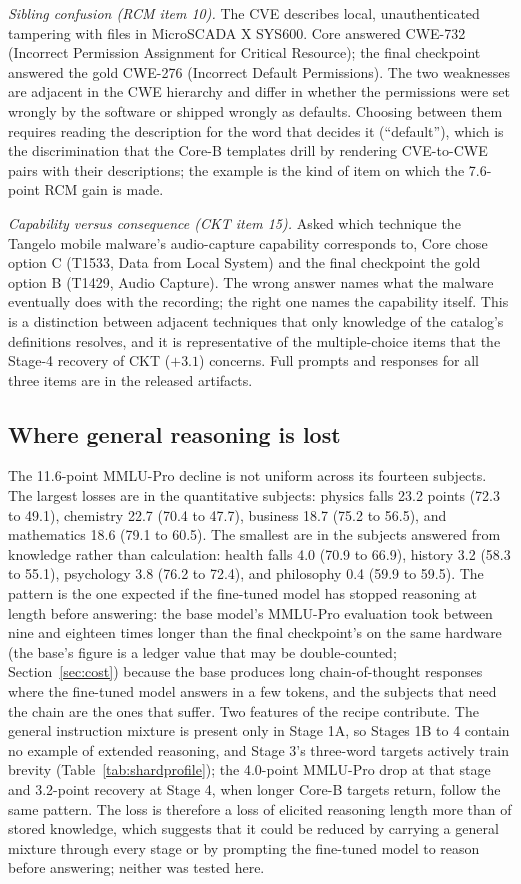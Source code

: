 \documentclass[a4paper,fleqn]{cas-dc}
\begin{document}
\emph{Sibling confusion (RCM item 10).} The CVE describes local, unauthenticated tampering with files in MicroSCADA X SYS600. Core answered CWE-732 (Incorrect Permission Assignment for Critical Resource); the final checkpoint answered the gold CWE-276 (Incorrect Default Permissions). The two weaknesses are adjacent in the CWE hierarchy and differ in whether the permissions were set wrongly by the software or shipped wrongly as defaults. Choosing between them requires reading the description for the word that decides it (``default''), which is the discrimination that the Core-B templates drill by rendering CVE-to-CWE pairs with their descriptions; the example is the kind of item on which the 7.6-point RCM gain is made.

\emph{Capability versus consequence (CKT item 15).} Asked which technique the Tangelo mobile malware's audio-capture capability corresponds to, Core chose option C (T1533, Data from Local System) and the final checkpoint the gold option B (T1429, Audio Capture). The wrong answer names what the malware eventually does with the recording; the right one names the capability itself. This is a distinction between adjacent techniques that only knowledge of the catalog's definitions resolves, and it is representative of the multiple-choice items that the Stage-4 recovery of CKT ($+3.1$) concerns. Full prompts and responses for all three items are in the released artifacts.

\subsection{Where general reasoning is lost}\label{sec:mmlu}
The 11.6-point MMLU-Pro decline is not uniform across its fourteen subjects. The largest losses are in the quantitative subjects: physics falls 23.2 points (72.3 to 49.1), chemistry 22.7 (70.4 to 47.7), business 18.7 (75.2 to 56.5), and mathematics 18.6 (79.1 to 60.5). The smallest are in the subjects answered from knowledge rather than calculation: health falls 4.0 (70.9 to 66.9), history 3.2 (58.3 to 55.1), psychology 3.8 (76.2 to 72.4), and philosophy 0.4 (59.9 to 59.5). The pattern is the one expected if the fine-tuned model has stopped reasoning at length before answering: the base model's MMLU-Pro evaluation took between nine and eighteen times longer than the final checkpoint's on the same hardware (the base's figure is a ledger value that may be double-counted; Section~\ref{sec:cost}) because the base produces long chain-of-thought responses where the fine-tuned model answers in a few tokens, and the subjects that need the chain are the ones that suffer. Two features of the recipe contribute. The general instruction mixture is present only in Stage 1A, so Stages 1B to 4 contain no example of extended reasoning, and Stage 3's three-word targets actively train brevity (Table~\ref{tab:shardprofile}); the 4.0-point MMLU-Pro drop at that stage and 3.2-point recovery at Stage 4, when longer Core-B targets return, follow the same pattern. The loss is therefore a loss of elicited reasoning length more than of stored knowledge, which suggests that it could be reduced by carrying a general mixture through every stage or by prompting the fine-tuned model to reason before answering; neither was tested here.
\end{document}
